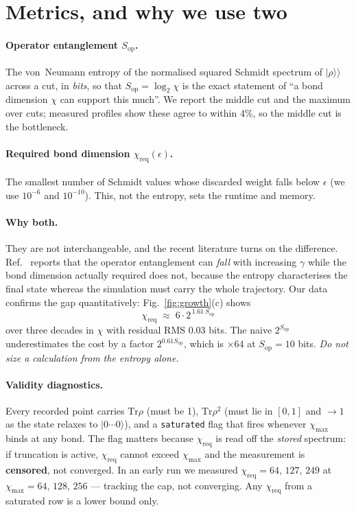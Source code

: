 \documentclass[11pt,a4paper]{article}
\newcommand{\Sop}{S_{\mathrm{op}}}
\newcommand{\chreq}{\chi_{\mathrm{req}}}
\begin{document}
\section{Metrics, and why we use two}
\label{sec:metrics}

\paragraph{Operator entanglement $\Sop$.} The von~Neumann entropy of the
normalised squared Schmidt spectrum of $|\rho\rangle\rangle$ across a cut,
in \emph{bits}, so that $\Sop=\log_2\chi$ is the exact statement of ``a bond
dimension $\chi$ can support this much''. We report the middle cut and the
maximum over cuts; measured profiles show these agree to within 4\%, so the
middle cut is the bottleneck.

\paragraph{Required bond dimension $\chreq(\epsilon)$.} The smallest number of
Schmidt values whose discarded weight falls below $\epsilon$ (we use $10^{-6}$
and $10^{-10}$). This, not the entropy, sets the runtime and memory.

\paragraph{Why both.} They are not interchangeable, and the recent literature
turns on the difference. Ref.~\cite{vilchez2025direct} reports that the operator
entanglement can \emph{fall} with increasing $\gamma$ while the bond dimension
actually required does not, because the entropy characterises the final state
whereas the simulation must carry the whole trajectory. Our data confirms the
gap quantitatively: Fig.~\ref{fig:growth}(c) shows
\begin{equation}
  \boxed{\ \chreq \;\approx\; 6\cdot 2^{\,1.61\,\Sop}\ }
  \label{eq:chiS}
\end{equation}
over three decades in $\chi$ with residual RMS $0.03$ bits. The naive $2^{\Sop}$
underestimates the cost by a factor $2^{0.61\Sop}$, which is $\times64$ at
$\Sop=10$ bits. \emph{Do not size a calculation from the entropy alone.}

\paragraph{Validity diagnostics.} Every recorded point carries
$\mathrm{Tr}\rho$ (must be 1), $\mathrm{Tr}\rho^2$ (must lie in $[0,1]$ and
$\to1$ as the state relaxes to $|0\cdots0\rangle$), and a \texttt{saturated}
flag that fires whenever $\chi_{\max}$ binds at any bond. The flag matters
because $\chreq$ is read off the \emph{stored} spectrum: if truncation is
active, $\chreq$ cannot exceed $\chi_{\max}$ and the measurement is
\textbf{censored}, not converged. In an early run we measured
$\chreq = 64,\,127,\,249$ at $\chi_{\max}=64,\,128,\,256$ --- tracking the cap,
not converging. Any $\chreq$ from a saturated row is a lower bound only.
\end{document}
